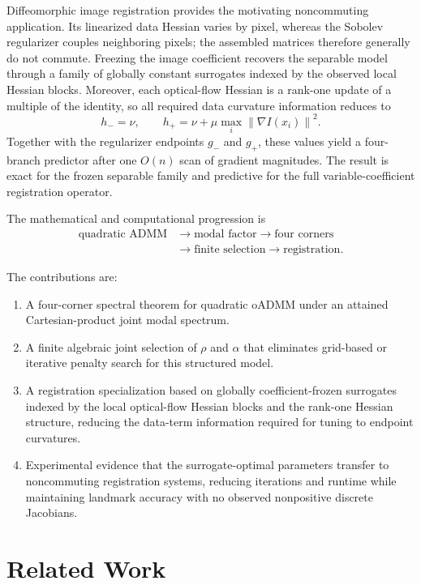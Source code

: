 \documentclass[pdflatex,iicol,sn-mathphys-num]{sn-jnl}
\theoremstyle{definition}
\newcommand{\norm}[1]{\left\lVert #1\right\rVert}
\begin{document}
Diffeomorphic image registration provides the motivating noncommuting
application. Its linearized data Hessian varies by pixel, whereas the Sobolev
regularizer couples neighboring pixels; the assembled matrices therefore
generally do not commute. Freezing the image coefficient recovers the separable
model through a family of globally constant surrogates indexed by the observed
local Hessian blocks. Moreover, each optical-flow Hessian is a rank-one update
of a multiple of the identity, so all required data curvature information
reduces to
\[
h_-=\nu,\qquad h_+=\nu+\mu\max_i\norm{\nabla I(x_i)}^2.
\]
Together with the regularizer endpoints $g_-$ and $g_+$, these values yield a
four-branch predictor after one $O(n)$ scan of gradient magnitudes. The result
is exact for the frozen separable family and predictive for the full
variable-coefficient registration operator.

The mathematical and computational progression is
\begin{align*}
\text{quadratic ADMM}&\longrightarrow\text{modal factor}\longrightarrow\text{four corners}\\
&\longrightarrow\text{finite selection}\longrightarrow\text{registration}.
\end{align*}

The contributions are:
\begin{enumerate}
\item A four-corner spectral theorem for quadratic oADMM under an attained
Cartesian-product joint modal spectrum.
\item A finite algebraic joint selection of $\rho$ and $\alpha$ that eliminates
grid-based or iterative penalty search for this structured model.
\item A registration specialization based on globally coefficient-frozen
surrogates indexed by the local optical-flow Hessian blocks and the rank-one
Hessian structure, reducing the data-term information required for tuning to
endpoint curvatures.
\item Experimental evidence that the surrogate-optimal parameters transfer to
noncommuting registration systems, reducing iterations and runtime while
maintaining landmark accuracy with no observed nonpositive discrete Jacobians.
\end{enumerate}

\section{Related Work}\label{sec:related}
\end{document}

